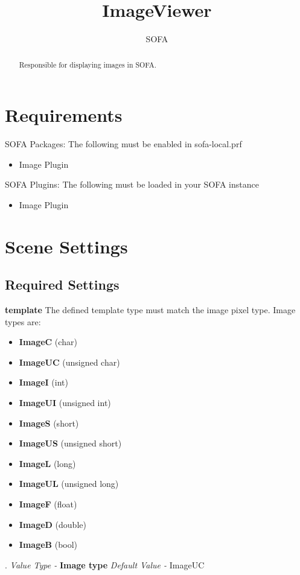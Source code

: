 \documentclass{article}
\newenvironment{componentoption}[1]%
{\textbf{#1}\newline}
{\newline}
\newcommand{\defaultvalue}[1] {\newline \textit{Default Value - } #1}
\newcommand{\valuetype}[1] {\newline \textit{Value Type - } \textbf{#1}}
\begin{document}
\raggedright

\title{ImageViewer}
\author{SOFA}

\maketitle

\begin{abstract}
Responsible for displaying images in SOFA.
\end{abstract}

\section{Requirements}

SOFA Packages:
The following must be enabled in sofa-local.prf
\begin{itemize}
\item Image Plugin
\end{itemize}

SOFA Plugins:
The following must be loaded in your SOFA instance
\begin{itemize}
\item Image Plugin
\end{itemize}

\section{Scene Settings}

\subsection{Required Settings}

\begin{componentoption}{template}
The defined template type must match the image pixel type. Image types are: 
\begin{itemize}
	\item \textbf{ImageC} (char)
	\item \textbf{ImageUC} (unsigned char)
	\item \textbf{ImageI} (int)
	\item \textbf{ImageUI} (unsigned int)
	\item \textbf{ImageS} (short)
	\item \textbf{ImageUS} (unsigned short)
	\item \textbf{ImageL} (long)
	\item \textbf{ImageUL} (unsigned long)
	\item \textbf{ImageF} (float)
	\item \textbf{ImageD} (double)
	\item \textbf{ImageB} (bool)
\end{itemize}
.
\valuetype{Image type}
\defaultvalue{ImageUC}
\end{componentoption}
\end{document}
